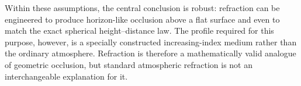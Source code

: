 Within these assumptions, the central conclusion is robust: refraction can be
engineered to produce horizon-like occlusion above a flat surface and even to
match the exact spherical height--distance law. The profile required for this
purpose, however, is a specially constructed increasing-index medium rather
than the ordinary atmosphere. Refraction is therefore a mathematically valid
analogue of geometric occlusion, but standard atmospheric refraction is not an
interchangeable explanation for it.

